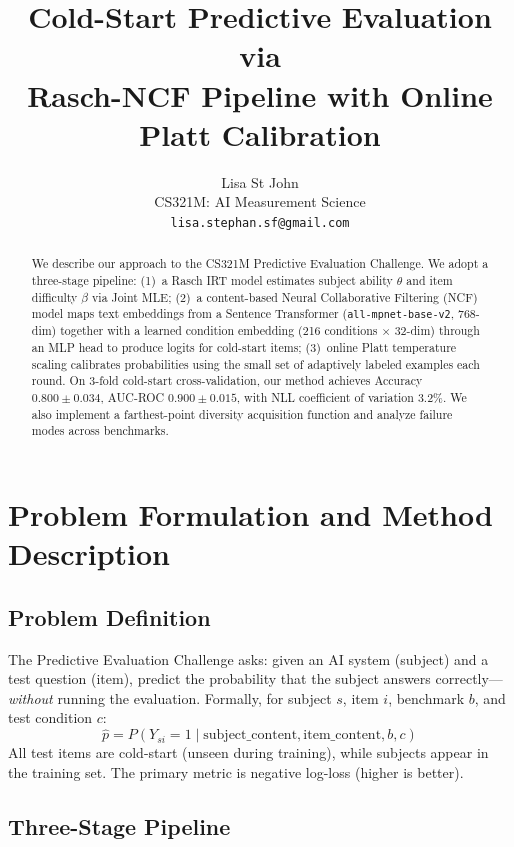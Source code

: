 \documentclass{article}
\title{Cold-Start Predictive Evaluation via\\Rasch-NCF Pipeline with Online Platt Calibration}
\author{
  Lisa St John \\
  CS321M: AI Measurement Science \\
  \texttt{lisa.stephan.sf@gmail.com}
}
\begin{document}
\maketitle

\begin{abstract}
We describe our approach to the CS321M Predictive Evaluation Challenge.
We adopt a three-stage pipeline:
(1)~a Rasch IRT model estimates subject ability $\theta$ and item difficulty $\beta$ via Joint MLE;
(2)~a content-based Neural Collaborative Filtering (NCF) model maps text embeddings from a Sentence Transformer (\texttt{all-mpnet-base-v2}, 768-dim) together with a learned condition embedding (216 conditions $\times$ 32-dim) through an MLP head to produce logits for cold-start items;
(3)~online Platt temperature scaling calibrates probabilities using the small set of adaptively labeled examples each round.
On 3-fold cold-start cross-validation, our method achieves Accuracy $0.800 \pm 0.034$, AUC-ROC $0.900 \pm 0.015$, with NLL coefficient of variation 3.2\%.
We also implement a farthest-point diversity acquisition function and analyze failure modes across benchmarks.
\end{abstract}

\section{Problem Formulation and Method Description}

\subsection{Problem Definition}

The Predictive Evaluation Challenge asks: given an AI system (subject) and a test question (item), predict the probability that the subject answers correctly---\emph{without} running the evaluation.
Formally, for subject $s$, item $i$, benchmark $b$, and test condition $c$:
\begin{equation}
  \hat{p} = P(Y_{si} = 1 \mid \text{subject\_content}, \text{item\_content}, b, c)
\end{equation}
All test items are cold-start (unseen during training), while subjects appear in the training set.
The primary metric is negative log-loss (higher is better).

\subsection{Three-Stage Pipeline}
\end{document}

